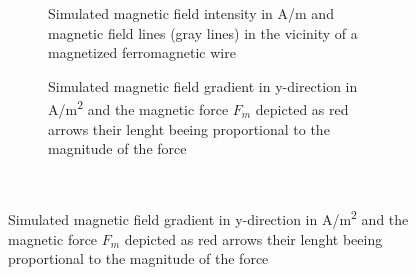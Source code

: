 \begin{figure}[H]
            \begin{subfigure}{0.49\textwidth}
                  \flushleft
                  \caption{Simulated magnetic field intensity in A/m and magnetic field lines (gray lines) in the vicinity of a magnetized ferromagnetic wire}\label{fig:sw_mag_field}
          \end{subfigure}\hfill
        \begin{subfigure}{0.49\textwidth}
                \flushright
                \caption{Simulated magnetic field gradient in y-direction in A/m\textsuperscript{2} and the magnetic force $F_{m}$ depicted as red arrows their lenght beeing proportional to the magnitude of the force}\label{fig:mag_force_sw}
        \end{subfigure}
        \\
        

\end{figure}

